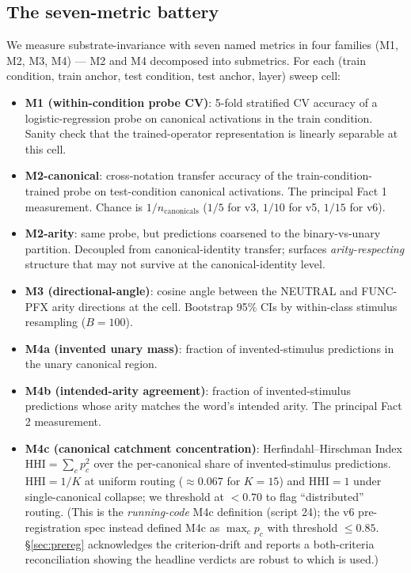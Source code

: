 \documentclass[11pt,letterpaper]{article}
\newcommand{\Mc}{M2-canonical}
\newcommand{\Ma}{M2-arity}
\newcommand{\Mbfb}{M4b}
\newcommand{\Mbfc}{M4c}
\begin{document}
\subsection{The seven-metric battery}
\label{sec:battery}

We measure substrate-invariance with seven named metrics in four
families (M1, M2, M3, M4) --- M2 and M4 decomposed into submetrics.
For each (train condition, train anchor, test condition, test anchor,
layer) sweep cell:

\begin{itemize}
  \item \textbf{M1 (within-condition probe CV)}: 5-fold stratified CV
  accuracy of a logistic-regression probe on canonical activations in
  the train condition. Sanity check that the trained-operator
  representation is linearly separable at this cell.
  \item \textbf{\Mc{}}: cross-notation transfer accuracy of the
  train-condition-trained probe on test-condition canonical
  activations. The principal Fact 1 measurement.
  Chance is $1/n_{\text{canonicals}}$ ($1/5$ for v3, $1/10$ for v5,
  $1/15$ for v6).
  \item \textbf{\Ma{}}: same probe, but predictions coarsened to the
  binary-vs-unary partition. Decoupled from canonical-identity
  transfer; surfaces \emph{arity-respecting} structure that may not
  survive at the canonical-identity level.
  \item \textbf{M3 (directional-angle)}: cosine angle between the
  NEUTRAL and FUNC-PFX arity directions at the cell. Bootstrap 95\%
  CIs by within-class stimulus resampling ($B = 100$).
  \item \textbf{M4a (invented unary mass)}: fraction of
  invented-stimulus predictions in the unary canonical region.
  \item \textbf{\Mbfb{} (intended-arity agreement)}: fraction of
  invented-stimulus predictions whose arity matches the word's
  intended arity. The principal Fact 2 measurement.
  \item \textbf{\Mbfc{} (canonical catchment concentration)}:
  Herfindahl--Hirschman Index
  $\mathrm{HHI} = \sum_c p_c^2$ over the per-canonical share of
  invented-stimulus predictions. $\mathrm{HHI} = 1/K$ at uniform
  routing ($\approx 0.067$ for $K=15$) and $\mathrm{HHI}=1$ under
  single-canonical collapse; we threshold at $< 0.70$ to flag
  ``distributed'' routing. (This is the \emph{running-code} \Mbfc{}
  definition (script 24); the v6 pre-registration spec instead
  defined \Mbfc{} as $\max_c p_c$ with threshold $\leq 0.85$.
  \S\ref{sec:prereg} acknowledges the criterion-drift and reports a
  both-criteria reconciliation showing the headline verdicts are
  robust to which is used.)
\end{itemize}
\end{document}

